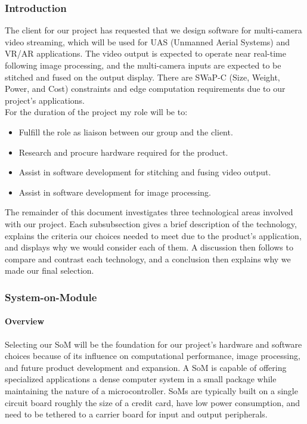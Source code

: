 \subsubsection{Introduction}

The client for our project has requested that we design software for multi-camera video 
streaming, which will be used for UAS (Unmanned Aerial Systems) and VR/AR applications. 
The video output is expected to operate near real-time following image processing, and the multi-camera inputs are 
expected to be stitched and fused on the output display. There are SWaP-C (Size, Weight, Power,
and Cost) constraints and edge computation requirements due to our project's applications. \\

For the duration of the project my role will be to:
\begin{itemize}
	\itemsep-2em
	\item Fulfill the role as liaison between our group and the client. \\
	\item Research and procure hardware required for the product. \\
	\item Assist in software development for stitching and fusing video output. \\
	\item Assist in software development for image processing. \\
\end{itemize}

The remainder of this document investigates three technological areas involved with 
our project. Each subsubsection gives a brief description of the technology, explains the 
criteria our choices needed to meet due to the product's application, and displays why 
we would consider each of them. A discussion then follows to compare and contrast each 
technology, and a conclusion then explains why we made our final selection.\\

\subsubsection{System-on-Module}

\paragraph{Overview}

Selecting our SoM will be the foundation for our project's hardware 
and software choices because of its influence on computational performance, image 
processing, and future product development and expansion. A SoM is capable of offering 
specialized applications a dense computer system in a small package while
maintaining the nature of a microcontroller. SoMs are typically built on a single 
circuit board roughly the size of a credit card, have low power consumption, and 
need to be tethered to a carrier board for input and output peripherals.\\

